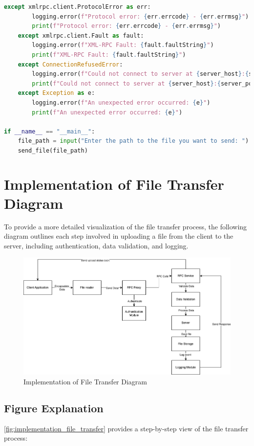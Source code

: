 \documentclass[12pt]{article}
\begin{document}
\begin{lstlisting}[language=Python, caption={Client-side Implementation}, label={lst:client_code}]
    except xmlrpc.client.ProtocolError as err:
        logging.error(f"Protocol error: {err.errcode} - {err.errmsg}")
        print(f"Protocol error: {err.errcode} - {err.errmsg}")
    except xmlrpc.client.Fault as fault:
        logging.error(f"XML-RPC Fault: {fault.faultString}")
        print(f"XML-RPC Fault: {fault.faultString}")
    except ConnectionRefusedError:
        logging.error(f"Could not connect to server at {server_host}:{server_port}")
        print(f"Could not connect to server at {server_host}:{server_port}")
    except Exception as e:
        logging.error(f"An unexpected error occurred: {e}")
        print(f"An unexpected error occurred: {e}")

if __name__ == "__main__":
    file_path = input("Enter the path to the file you want to send: ").strip()
    send_file(file_path)
\end{lstlisting}



\section{Implementation of File Transfer Diagram}
To provide a more detailed visualization of the file transfer process, the following diagram outlines each step involved in uploading a file from the client to the server, including authentication, data validation, and logging.

\begin{figure}[H]
    \centering
    \includegraphics[width=\linewidth]{figure2.png}
    \caption{Implementation of File Transfer Diagram}
    \label{fig:implementation_file_transfer}
\end{figure}

\subsection{Figure Explanation}
\autoref{fig:implementation_file_transfer} provides a step-by-step view of the file transfer process:
\end{document}
